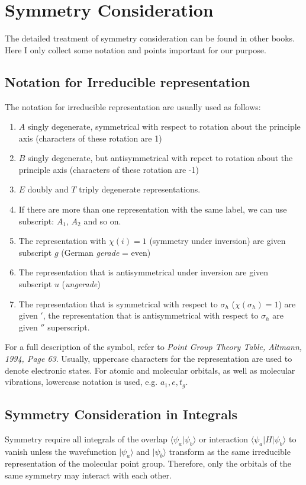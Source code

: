 \documentclass{article}
\newcommand{\statebra}[1]{\langle #1 |}
\newcommand{\stateket}[1]{| #1 \rangle}
\begin{document}
\section{Symmetry Consideration}
The detailed treatment of symmetry consideration can be found in other books. Here I only
collect some notation and points important for our purpose. 
\subsection{Notation for Irreducible representation}
The notation for irreducible representation are usually used as follows:
\begin{enumerate}
    \item $A$ singly degenerate, symmetrical with respect to rotation about the principle axis (characters of these rotation are 1)
    \item $B$ singly degenerate, but antisymmetrical with repect to rotation about the principle axis (characters of these rotation are -1)
    \item $E$ doubly and $T$ triply degenerate representations.
    \item If there are more than one representation with the same label, we can use subscript: $A_1$, $A_2$ and so on.
    \item The representation with $\chi(i) = 1$ (symmetry under inversion) are given subscript $g$ (German \emph{gerade} = even)
    \item The representation that is antisymmetrical under inversion are given subscript $u$ (\emph{ungerade})
    \item The representation that is symmetrical with respect to $\sigma_h$ ($\chi(\sigma_h) = 1$) are given $'$, the representation 
            that is antisymmetrical with respect to $\sigma_h$ are given $''$ superscript.
\end{enumerate}
For a full description of the symbol, refer to \emph{Point Group Theory Table, Altmann, 1994, Page 63}. 
Usually, uppercase characters for the representation are used to denote electronic states. For 
atomic and molecular orbitals, as well as molecular vibrations, lowercase notation is used, e.g. 
$a_1, e, t_g$.

\subsection{Symmetry Consideration in Integrals} 
Symmetry require all integrals of the overlap $\statebra{\psi_a} \psi_b \rangle$ or 
interaction $\statebra{\psi_a} H \stateket{\psi_b}$ to vanish unless the wavefunction
$\stateket{\psi_a}$ and $\stateket{\psi_b}$ transform as the same irreducible 
representation of the molecular point group. Therefore, only the orbitals of the 
same symmetry may interact with each other. 
\end{document}
